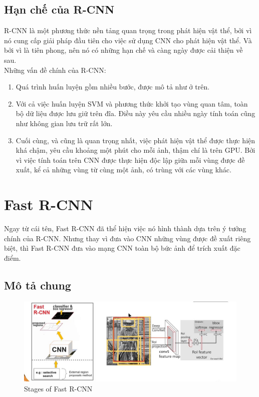 \subsection{Hạn chế của R-CNN}

R-CNN là một phương thức nền tảng quan trọng trong phát hiện vật thể, bởi vì nó cung cấp giải pháp đầu tiên cho việc sử dụng CNN cho phát hiện vật thể. Và bởi vì là tiên phong, nên nó có những hạn chế và càng ngày được cải thiện về sau.\\

Những vấn đề chính của R-CNN:
\begin{enumerate}
	\item Quá trình huấn luyện gồm nhiều bước, được mô tả như ở trên.
	\item Với cả việc huấn luyện SVM và phương thức khởi tạo vùng quan tâm, toàn bộ dữ liệu được lưu giữ trên đĩa. Điều này yêu cầu nhiều ngày tính toán cũng như không gian lưu trữ rất lớn.
	\item Cuối cùng, và cũng là quan trọng nhất, việc phát hiện vật thể được thực hiện khá chậm, yêu cầu khoảng một phút cho mỗi ảnh, thậm chí là trên GPU. Bởi vì việc tính toán trên CNN được thực hiện độc lập giữa mỗi vùng được đề xuất,  kể cả những vùng từ cùng một ảnh, có trùng với các vùng khác.
\end{enumerate}

\section{Fast R-CNN} 

Ngay từ cái tên, Fast R-CNN \cite{Girshick2015FastR} đã thể hiện việc nó hình thành dựa trên ý tưởng chính của R-CNN. Nhưng thay vì đưa vào CNN những vùng được đề xuất riêng biệt, thì Fast R-CNN đưa vào mạng CNN toàn bộ bức ảnh để trích xuất đặc điểm.

\subsection{Mô tả chung}

\begin{center}
   \begin{figure}[H]
   \begin{center}
     \includegraphics[scale=0.3]{image/fast_rcnn_1}
    \end{center}
    \caption{Stages of Fast R-CNN}
    \label{ref_fast-rcnn}
    \end{figure}
\end{center}

